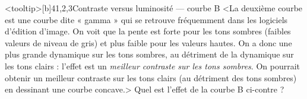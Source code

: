 \begin{quiz}[title={Photographie numérique}]
%
\begin{quizquestion*}<tooltip>[b]{4}{1,2,3}{Contraste {\upshape versus} luminosité --- courbe B}
<La deuxième courbe est une courbe dite « gamma » qui se retrouve fréquemment dans les logiciels d'édition d'image. On voit que la pente est forte pour les tons sombres (faibles valeurs de niveau de gris) et plus faible pour les valeurs hautes. On a donc une plus grande dynamique sur les tons sombres, au détriment de la dynamique sur les tons clairs : l'effet est un \emph{meilleur contraste sur les tons sombres}. On pourrait obtenir un meilleur contraste sur les tons clairs (au détriment des tons sombres) en dessinant une courbe concave.>
Quel est l'effet de la courbe B ci-contre ?
\end{quizquestion*}



\end{quiz}
